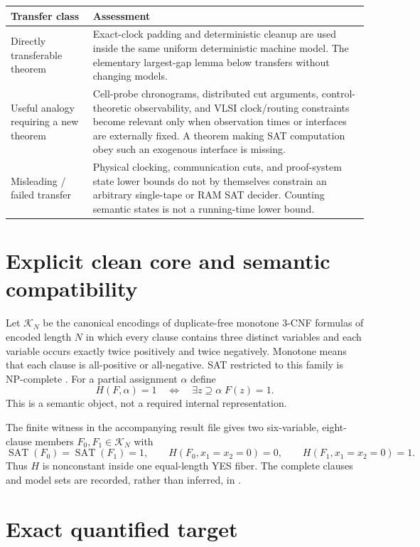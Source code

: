 \documentclass[11pt]{article}
\begin{document}
\begin{longtable}{p{.23\linewidth}p{.69\linewidth}}
\toprule
Transfer class & Assessment \\
\midrule
Directly transferable theorem & Exact-clock padding and deterministic cleanup are used
inside the same uniform deterministic machine model.  The elementary largest-gap lemma
below transfers without changing models. \\
Useful analogy requiring a new theorem & Cell-probe chronograms, distributed cut
arguments, control-theoretic observability, and VLSI clock/routing constraints become
relevant only when observation times or interfaces are externally fixed.  A theorem
making SAT computation obey such an exogenous interface is missing. \\
Misleading / failed transfer & Physical clocking, communication cuts, and proof-system
state lower bounds do not by themselves constrain an arbitrary single-tape or RAM SAT
decider.  Counting semantic states is not a running-time lower bound. \\
\bottomrule
\end{longtable}

\section{Explicit clean core and semantic compatibility}

Let $\mathcal K_N$ be the canonical encodings of duplicate-free monotone 3-CNF formulas
of encoded length $N$ in which every clause contains three distinct variables and each
variable occurs exactly twice positively and twice negatively.  Monotone means that each
clause is all-positive or all-negative.  SAT restricted to this family is NP-complete
\cite{docker}.  For a partial assignment $\alpha$ define
\[
 H(F,\alpha)=1 \quad\Longleftrightarrow\quad
 \exists z\supseteq\alpha\; F(z)=1.
\]
This is a semantic object, not a required internal representation.

The finite witness in the accompanying result file gives two six-variable, eight-clause
members $F_0,F_1\in\mathcal K_N$ with
\[
 \operatorname{SAT}(F_0)=\operatorname{SAT}(F_1)=1,
 \qquad H(F_0,x_1=x_2=0)=0,
 \qquad H(F_1,x_1=x_2=0)=1.
\]
Thus $H$ is nonconstant inside one equal-length YES fiber.  The complete clauses and
model sets are recorded, rather than inferred, in
.

\section{Exact quantified target}
\end{document}
